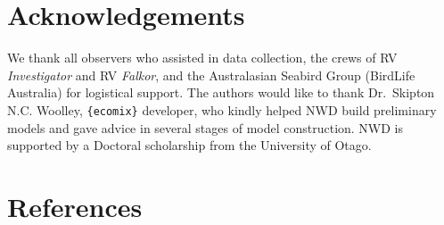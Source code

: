 \documentclass{article}
\begin{document}
\hypertarget{acknowledgements}{%
\section{Acknowledgements}\label{acknowledgements}}

We thank all observers who assisted in data collection, the crews of RV \emph{Investigator} and RV \emph{Falkor}, and the Australasian Seabird Group (BirdLife Australia) for logistical support. The authors would like to thank Dr.~Skipton N.C. Woolley, \texttt{\{ecomix\}} developer, who kindly helped NWD build preliminary models and gave advice in several stages of model construction. NWD is supported by a Doctoral scholarship from the University of Otago.

\hypertarget{references}{%
\section{References}\label{references}}
\end{document}
